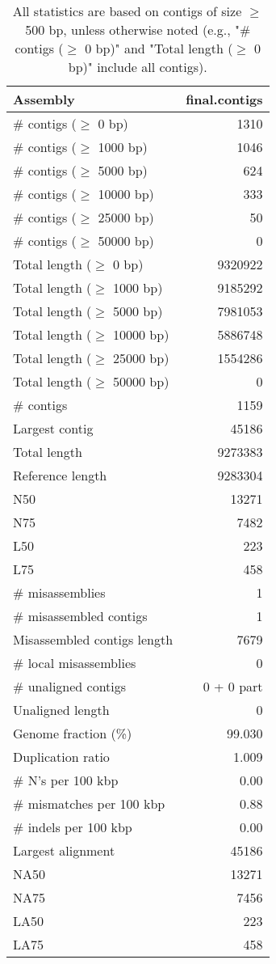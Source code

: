 \documentclass[12pt,a4paper]{article}
\begin{document}
\begin{table}[ht]
\begin{center}
\caption{All statistics are based on contigs of size $\geq$ 500 bp, unless otherwise noted (e.g., "\# contigs ($\geq$ 0 bp)" and "Total length ($\geq$ 0 bp)" include all contigs).}
\begin{tabular}{|l*{1}{|r}|}
\hline
Assembly & final.contigs \\ \hline
\# contigs ($\geq$ 0 bp) & 1310 \\ \hline
\# contigs ($\geq$ 1000 bp) & 1046 \\ \hline
\# contigs ($\geq$ 5000 bp) & 624 \\ \hline
\# contigs ($\geq$ 10000 bp) & 333 \\ \hline
\# contigs ($\geq$ 25000 bp) & 50 \\ \hline
\# contigs ($\geq$ 50000 bp) & 0 \\ \hline
Total length ($\geq$ 0 bp) & 9320922 \\ \hline
Total length ($\geq$ 1000 bp) & 9185292 \\ \hline
Total length ($\geq$ 5000 bp) & 7981053 \\ \hline
Total length ($\geq$ 10000 bp) & 5886748 \\ \hline
Total length ($\geq$ 25000 bp) & 1554286 \\ \hline
Total length ($\geq$ 50000 bp) & 0 \\ \hline
\# contigs & 1159 \\ \hline
Largest contig & 45186 \\ \hline
Total length & 9273383 \\ \hline
Reference length & 9283304 \\ \hline
N50 & 13271 \\ \hline
N75 & 7482 \\ \hline
L50 & 223 \\ \hline
L75 & 458 \\ \hline
\# misassemblies & 1 \\ \hline
\# misassembled contigs & 1 \\ \hline
Misassembled contigs length & 7679 \\ \hline
\# local misassemblies & 0 \\ \hline
\# unaligned contigs & 0 + 0 part \\ \hline
Unaligned length & 0 \\ \hline
Genome fraction (\%) & 99.030 \\ \hline
Duplication ratio & 1.009 \\ \hline
\# N's per 100 kbp & 0.00 \\ \hline
\# mismatches per 100 kbp & 0.88 \\ \hline
\# indels per 100 kbp & 0.00 \\ \hline
Largest alignment & 45186 \\ \hline
NA50 & 13271 \\ \hline
NA75 & 7456 \\ \hline
LA50 & 223 \\ \hline
LA75 & 458 \\ \hline
\end{tabular}
\end{center}
\end{table}
\end{document}
